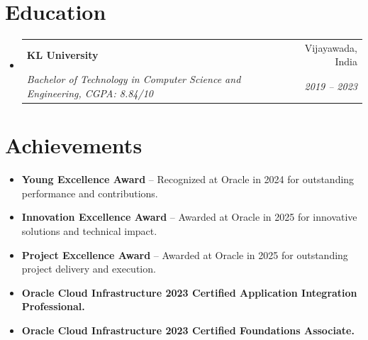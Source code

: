 \documentclass[letterpaper,11pt]{article}
\makeatletter
\newcommand{\resumeItem}[1]{
  \item\small{
    {#1 \vspace{-2pt}}
  }
}
\newcommand{\resumeSubheading}[4]{
  \vspace{-2pt}\item
    \begin{tabular*}{0.97\textwidth}[t]{l@{\extracolsep{\fill}}r}
      \textbf{#1} & #2 \\
      \textit{\small#3} & \textit{\small #4} \\
    \end{tabular*}\vspace{-7pt}
}
\newcommand{\resumeSubHeadingListStart}{\begin{itemize}[leftmargin=0.15in, label={}]}
\newcommand{\resumeSubHeadingListEnd}{\end{itemize}}
\newcommand{\resumeItemListStart}{\begin{itemize}}
\newcommand{\resumeItemListEnd}{\end{itemize}\vspace{-5pt}}
\makeatother
\begin{document}
\vspace{-6pt}

\section{Education}
\resumeSubHeadingListStart
    \resumeSubheading
        {KL University}{Vijayawada, India}
        {Bachelor of Technology in Computer Science and Engineering, CGPA: 8.84/10}{2019 -- 2023}
\resumeSubHeadingListEnd

\vspace{-6pt}

\section{Achievements}
\resumeItemListStart
    \resumeItem{\textbf{Young Excellence Award} -- Recognized at Oracle in 2024 for outstanding performance and contributions.}
    \resumeItem{\textbf{Innovation Excellence Award} -- Awarded at Oracle in 2025 for innovative solutions and technical impact.}
    \resumeItem{\textbf{Project Excellence Award} -- Awarded at Oracle in 2025 for outstanding project delivery and execution.}
    \resumeItem{\textbf{Oracle Cloud Infrastructure 2023 Certified Application Integration Professional.}}
    \resumeItem{\textbf{Oracle Cloud Infrastructure 2023 Certified Foundations Associate.}}
\resumeItemListEnd
\end{document}
